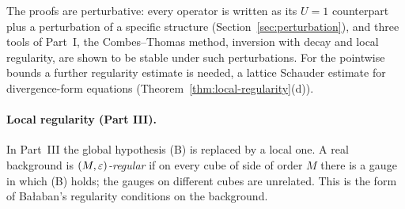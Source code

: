 The proofs are perturbative: every operator is written as its $U=1$ counterpart plus a perturbation of a specific structure (Section~\ref{sec:perturbation}), and three tools of Part~I, the Combes--Thomas method, inversion with decay and local regularity, are shown to be stable under such perturbations. For the pointwise bounds a further regularity estimate is needed, a lattice Schauder estimate for divergence-form equations (Theorem~\ref{thm:local-regularity}(d)).

\paragraph{Local regularity (Part III).} In Part~III the global hypothesis (B) is replaced by a local one. A real background is \emph{$(M,\varepsilon)$-regular} if on every cube of side of order $M$ there is a gauge in which (B) holds; the gauges on different cubes are unrelated. This is the form of Ba\l aban's regularity conditions on the background.

